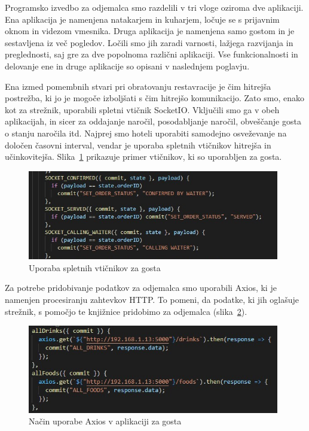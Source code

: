 \documentclass[a4paper, 12pt]{book}
\begin{document}
Programsko izvedbo za odjemalca smo razdelili v tri vloge oziroma dve aplikaciji. Ena aplikacija je namenjena natakarjem in kuharjem, ločuje se s prijavnim oknom in videzom vmesnika. Druga aplikacija je namenjena samo gostom in je sestavljena iz več pogledov. Ločili smo jih zaradi varnosti, lažjega razvijanja in preglednosti, saj gre za dve popolnoma različni aplikaciji. Vse funkcionalnosti in delovanje ene in druge aplikacije so opisani v naslednjem poglavju.

Ena izmed pomembnih stvari pri obratovanju restavracije je čim hitrejša postrežba, ki jo je mogoče izboljšati s čim hitrejšo komunikacijo. Zato smo, enako kot za strežnik, uporabili spletni vtičnik SocketIO. Vključili smo ga v obeh aplikacijah, in sicer za oddajanje naročil, posodabljanje naročil, obveščanje gosta o stanju naročila itd. Najprej smo hoteli uporabiti samodejno osveževanje na določen časovni interval, vendar je uporaba spletnih vtičnikov hitrejša in učinkovitejša. Slika~\ref{socketioo1} prikazuje primer vtičnikov, ki so uporabljen za gosta.

\begin{figure}[!htb]
\begin{center}
\includegraphics[width=11cm]{socketio_2.jpg}
\caption{Uporaba spletnih vtičnikov za gosta}
\label{socketioo1}
\end{center}
\end{figure}

Za potrebe pridobivanje podatkov za odjemalca smo uporabili Axios, ki je namenjen procesiranju zahtevkov  HTTP. To pomeni, da podatke, ki jih oglašuje strežnik, s pomočjo te knjižnice pridobimo za odjemalca (slika~\ref{axios_1}). 

\begin{figure}[!htb]
\begin{center}
\includegraphics[width=11cm]{axios_1.jpg}
\caption{Način uporabe Axios v aplikaciji za gosta}
\label{axios_1}
\end{center}
\end{figure}
\end{document}
